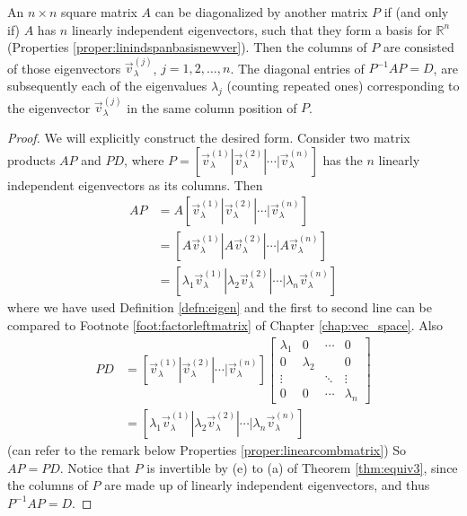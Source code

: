 \begin{proper}
\label{proper:diagonalize}
An $n \times n$ square matrix $A$ can be diagonalized by another matrix $P$ if (and only if) $A$ has $n$ linearly independent eigenvectors, such that they form a basis for $\mathbb{R}^n$ (Properties \ref{proper:linindspanbasisnewver}). Then the columns of $P$ are consisted of those eigenvectors $\vec{v}_\lambda^{(j)}$, $j = 1,2,\ldots,n$. The diagonal entries of $P^{-1}AP = D$, are subsequently each of the eigenvalues $\lambda_j$ (counting repeated ones) corresponding to the eigenvector $\vec{v}_\lambda^{(j)}$ in the same column position of $P$. 
\end{proper}
\begin{proof}
We will explicitly construct the desired form. Consider two matrix products $AP$ and $PD$, where $P = [\vec{v}_\lambda^{(1)}|\vec{v}_\lambda^{(2)}|\cdots|\vec{v}_\lambda^{(n)}]$ has the $n$ linearly independent eigenvectors as its columns. Then
\begin{align*}
AP &= A[\vec{v}_\lambda^{(1)}|\vec{v}_\lambda^{(2)}|\cdots|\vec{v}_\lambda^{(n)}] \\
&= [A\vec{v}_\lambda^{(1)}|A\vec{v}_\lambda^{(2)}|\cdots|A\vec{v}_\lambda^{(n)}] \\
&= [\lambda_1\vec{v}_\lambda^{(1)}|\lambda_2\vec{v}_\lambda^{(2)}|\cdots|\lambda_n \vec{v}_\lambda^{(n)}]
\end{align*}
where we have used Definition \ref{defn:eigen} and the first to second line can be compared to Footnote \ref{foot:factorleftmatrix} of Chapter \ref{chap:vec_space}. Also
\begin{align*}
PD &= [\vec{v}_\lambda^{(1)}|\vec{v}_\lambda^{(2)}|\cdots|\vec{v}_\lambda^{(n)}]
\begin{bmatrix}
\lambda_1 & 0 & \cdots & 0 \\
0 & \lambda_2 & & 0 \\
\vdots & & \ddots & \vdots \\
0 & 0 & \cdots & \lambda_n
\end{bmatrix} \\
&= [\lambda_1\vec{v}_\lambda^{(1)}|\lambda_2\vec{v}_\lambda^{(2)}|\cdots|\lambda_n \vec{v}_\lambda^{(n)}]
\end{align*}
(can refer to the remark below Properties \ref{proper:linearcombmatrix}) So $AP = PD$. Notice that $P$ is invertible by (e) to (a) of Theorem \ref{thm:equiv3}, since the columns of $P$ are made up of linearly independent eigenvectors, and thus $P^{-1}AP = D$.
\end{proof}

